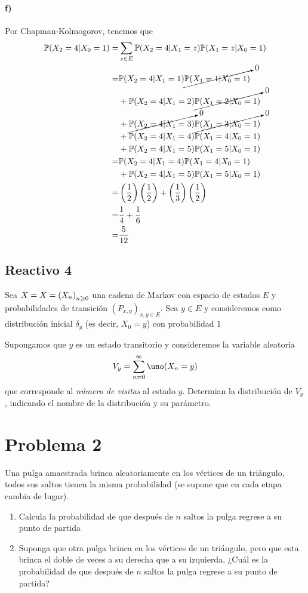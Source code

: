 \documentclass[a4paper,12pt]{article}
\begin{document}
\paragraph{f)} Por Chapman-Kolmogorov, tenemos que
\begin{align*}
    \mathbb{P}(X_2=4|X_0=1)=&\sum_{z\in E}\mathbb{P}(X_2=4|X_1=z)\mathbb{P}(X_1=z|X_0=1)\\
    =&\mathbb{P}(X_2=4|X_1=1)\cancelto{0}{\mathbb{P}(X_1=1|X_0=1)}\\
    &+\mathbb{P}(X_2=4|X_1=2)\cancelto{0}{\mathbb{P}(X_1=2|X_0=1)}\\
    &+\cancelto{0}{\mathbb{P}(X_2=4|X_1=3)}\cancelto{0}{\mathbb{P}(X_1=3|X_0=1)}\\
    &+\mathbb{P}(X_2=4|X_1=4)\mathbb{P}(X_1=4|X_0=1)\\
    &+\mathbb{P}(X_2=4|X_1=5)\mathbb{P}(X_1=5|X_0=1)\\
    =&\mathbb{P}(X_2=4|X_1=4)\mathbb{P}(X_1=4|X_0=1)\\
    &+\mathbb{P}(X_2=4|X_1=5)\mathbb{P}(X_1=5|X_0=1)\\
    =&\left(\frac{1}{2}\right)\left(\frac{1}{2}\right)
    +\left(\frac{1}{3}\right)\left(\frac{1}{2}\right)\\
    =&\frac{1}{4}+\frac{1}{6}\\
    =&\frac{5}{12}
\end{align*}
\subsection{Reactivo 4}
\begin{displayquote}
    Sea $X=X=\cdm[n][0]{X_n}$ una cadena de Markov con espacio de estados $E$ y probabilidades de transición $(P_{x,y})_{x,y\in E}$. Sea $y\in E$ y consideremos como distribución inicial $\delta_y$ (es decir, $X_0=y$) con probabilidad $1$
    \par Supongamos que $y$ es un estado transitorio y consideremos la variable aleatoria
    \[V_y=\sum_{n=0}^\infty\uno(X_n=y)\]
    que corresponde al \textit{número de visitas} al estado $y$. Determian la distribución de $V_y$, indicando el nombre de la distribución y su parámetro.
\end{displayquote}
\section{Problema 2}
\begin{displayquote}
    Una pulga amaestrada brinca aleatoriamente en los vértices de un triángulo, todos sus saltos tienen la misma probabilidad (se supone que en cada etapa cambia de lugar).
    \begin{enumerate}
        \item Calcula la probabilidad de que después de $n$ saltos la pulga regrese a su punto de partida
        \item Suponga que otra pulga brinca en los vértices de un triángulo, pero que esta brinca el doble de veces a su derecha que a su izquierda. ¿Cuál es la probabilidad de que después de $n$ saltos la pulga regrese a su punto de partida?
    \end{enumerate}
\end{displayquote}
\end{document}
